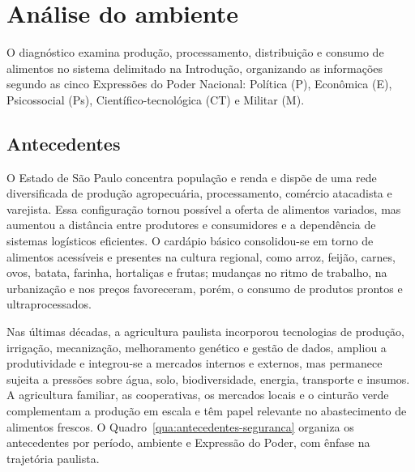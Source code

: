 \documentclass[
	12pt,				%
	openright,			%
	oneside,			%
	a4paper,			%
	chapter=TITLE,		%
	section=TITLE,		%
	english,			%
	french,				%
	spanish,			%
	brazil,				%
 ]{abntex2}
\begin{document}
\section{Análise do ambiente}
O diagnóstico examina produção, processamento, distribuição e consumo de
alimentos no sistema delimitado na Introdução, organizando as informações
segundo as cinco Expressões do Poder Nacional: Política (P), Econômica (E),
Psicossocial (Ps), Científico-tecnológica (CT) e Militar (M).

\subsection{Antecedentes}
O Estado de São Paulo concentra população e renda e dispõe de uma rede
diversificada de produção agropecuária, processamento, comércio atacadista e
varejista. Essa configuração tornou possível a oferta de alimentos variados,
mas aumentou a distância entre produtores e consumidores e a dependência de
sistemas logísticos eficientes. O cardápio básico consolidou-se em torno de
alimentos acessíveis e presentes na cultura regional, como arroz, feijão,
carnes, ovos, batata, farinha, hortaliças e frutas; mudanças no ritmo de
trabalho, na urbanização e nos preços favoreceram, porém, o consumo de produtos
prontos e ultraprocessados.

Nas últimas décadas, a agricultura paulista incorporou tecnologias de produção,
irrigação, mecanização, melhoramento genético e gestão de dados, ampliou a
produtividade e integrou-se a mercados internos e externos, mas permanece
sujeita a pressões sobre água, solo, biodiversidade, energia, transporte e
insumos. A agricultura familiar, as cooperativas, os mercados locais e o
cinturão verde complementam a produção em escala e têm papel relevante no
abastecimento de alimentos frescos. O Quadro~\ref{qua:antecedentes-seguranca}
organiza os antecedentes por período, ambiente e Expressão do Poder, com ênfase
na trajetória paulista.
\end{document}
